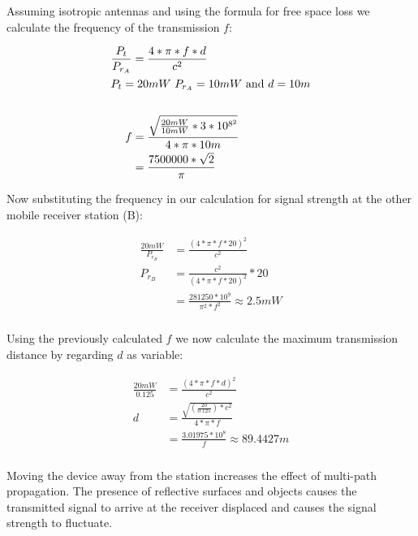 \documentclass[12pt]{article}
\newcommand{\multipartexercise}{\addtocounter{subsection}{1}\setcounter{subsubsection}{0}}
\newcommand{\exercisepart}{\subsubsection{}}
\begin{document}
\multipartexercise \exercisepart
Assuming isotropic antennas and using the formula for free space loss we calculate the frequency of the transmission $f$:

\begin{align*}
    \frac{P_t}{P_{r_A}} &= \frac{4*\pi*f*d}{c^2} \\
    \intertext{$P_t=20mW$ $P_{r_A}=10mW$ and $d=10m$} \\
    f &= \frac{\sqrt{\frac{20mW}{10mW}*3*10^{8^2}}}{4*\pi*10m} \\
    &= \frac{7500000*\sqrt{2}}{\pi}
\end{align*}

Now substituting the frequency in our calculation for signal strength at the other mobile receiver station (B):

\begin{align*}
    \frac{20mW}{P_{r_B}} &= \frac{(4*\pi*f*20)^2}{c^2} \\
    P_{r_B} &= \frac{c^2}{(4*\pi*f*20)^2}*20 \\
    &= \frac{281250*10^9}{\pi^2*f^2} \approx 2.5mW
\end{align*}

\exercisepart
Using the previously calculated $f$ we now calculate the maximum transmission distance by regarding $d$ as variable:

\begin{align*}
    \frac{20mW}{0.125} &= \frac{(4*\pi*f*d)^2}{c^2} \\
    d &= \frac{\sqrt{(\frac{20}{0.125})*c^2}}{4*\pi*f} \\
    &= \frac{3.01975*10^8}{f} \approx 89.4427m
\end{align*}

\exercisepart
Moving the device away from the station increases the effect of multi-path propagation. The presence of reflective surfaces and objects causes the transmitted signal to arrive at the receiver displaced and causes the signal strength to fluctuate.
\end{document}

